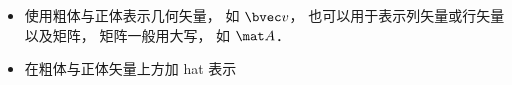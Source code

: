 
\begin{itemize}
\item 使用粗体与正体表示几何矢量， 如 $\bvec v$， 也可以用于表示列矢量或行矢量以及矩阵， 矩阵一般用大写， 如 $\mat A$．
\item 在粗体与正体矢量上方加 hat 表示
\end{itemize}
